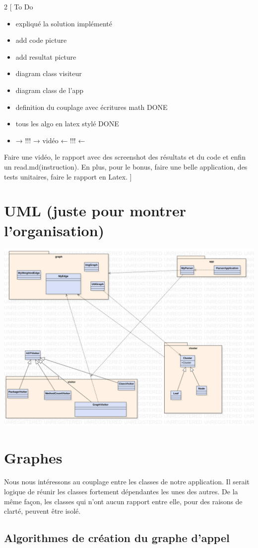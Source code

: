 \documentclass[a4paper]{article}
\begin{document}
    \newpage
    \begin{multicols}{2}
        [
            To Do
            \begin{itemize}
                \item expliqué la solution implémenté
                \item add code picture 
                \item add resultat picture
                \item diagram class visiteur
                \item diagram class de l'app
                \item definition du couplage avec écritures math DONE
                \item tous les algo en latex stylé DONE
                \item → !!! → vidéo ← !!! ← 
            \end{itemize}
            Faire une vidéo, le rapport avec des screenshot des résultats et du code et enfin un read.md(instruction). En plus, pour le bonus, faire une belle application, des tests unitaires, faire le rapport en Latex.
        ]
        \section{UML (juste pour montrer l'organisation)}
        \noindent\includegraphics[width=.46\textwidth]{diagram}
        \section{Graphes}
        \paragraph{} 
        Nous nous intéressons au couplage entre les classes de notre application. Il serait logique de réunir les classes fortement dépendantes les unes des autres. De la même façon, les classes qui n'ont aucun rapport entre elle, pour des raisons de clarté, peuvent être isolé.
        \subsection{Algorithmes de création du graphe d'appel}

\end{multicols}
\end{document}
